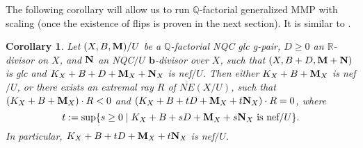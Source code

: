 \documentclass[11pt]{amsart}
\numberwithin{equation}{section}
\newcommand{\bb}{\bm{b}}
\newcommand{\Mm}{{\bf{M}}}
\newcommand{\NN}{{\bf{N}}}
\newcommand{\Qq}{\mathbb{Q}}
\newcommand{\Rr}{\mathbb{R}}
\newcommand{\Pic}{\mathrm{Pic}}
\newtheorem{cor}[thm]{Corollary}
\theoremstyle{definition}
\theoremstyle{definition}
\newtheorem{rem}[thm]{Remark}
\theoremstyle{definition}
\begin{document}

The following corollary will allow us to run $\Qq$-factorial generalized MMP with scaling (once the existence of flips is proven in the next section). It is similar to \cite[Lemma 3.19]{HL18}. 

\begin{cor}\label{cor: can run glc mmp with scaling}
Let $(X,B,\Mm)/U$ be a $\Qq$-factorial NQC glc g-pair, $D\geq 0$ an $\Rr$-divisor on $X$, and $\NN$ an NQC$/U$ $\bb$-divisor over $X$, such that $(X,B+D,\Mm+\NN)$ is glc and $K_X+B+D+\Mm_X+\NN_X$ is nef$/U$. Then either $K_X+B+\Mm_X$ is nef$/U$, or there exists an extremal ray $R$ of $\overline{NE}(X/U)$, such that $(K_X+B+\Mm_X)\cdot R<0$ and $(K_X+B+tD+\Mm_X+t\NN_X)\cdot R=0$, where
$$t:=\sup\{s\geq 0\mid K_X+B+sD+\Mm_X+s\NN_X\text{ is nef}/U\}.$$
In particular, $K_X+B+tD+\Mm_X+t\NN_X$ is nef$/U$.
\end{cor}
\end{document}
